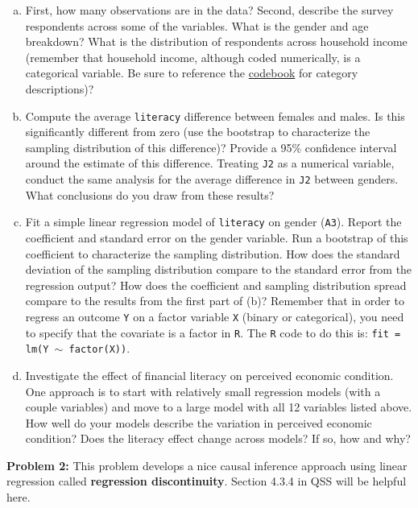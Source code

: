 \documentclass[11pt]{article}
\begin{document}
\begin{enumerate}[a.] 
\item First, how many observations are in the data? Second, describe the survey respondents across some of the variables.  What is the gender and age breakdown?  What is the distribution of respondents across household income (remember that household income, although coded numerically, is a categorical variable.  Be sure to reference the \href{https://github.com/dpuelz/Policy-Research-Laboratory/blob/main/readings/2018NFCScodebook.pdf}{codebook} for category descriptions)?  
\item Compute the average {\tt literacy} difference between females and males.  Is this significantly different from zero (use the bootstrap to characterize the sampling distribution of this difference)?  Provide a 95\% confidence interval around the estimate of this difference.  Treating {\tt J2} as a numerical variable, conduct the same analysis for the average difference in {\tt J2} between genders.  What conclusions do you draw from these results?
\item Fit a simple linear regression model of {\tt literacy} on gender ({\tt A3}).  Report the coefficient and standard error on the gender variable.  Run a bootstrap of this coefficient to characterize the sampling distribution.  How does the standard deviation of the sampling distribution compare to the standard error from the regression output?  How does the coefficient and sampling distribution spread compare to the results from the first part of (b)?  Remember that in order to regress an outcome {\tt Y} on a factor variable {\tt X} (binary or categorical), you need to specify that the covariate is a factor in {\tt R}.  The {\tt R} code to do this is: {\tt fit = lm(Y $\sim$ factor(X))}.
\item Investigate the effect of financial literacy on perceived economic condition.  One approach is to start with relatively small regression models (with a couple variables) and move to a large model with all 12 variables listed above.  How well do your models describe the variation in perceived economic condition?  Does the literacy effect change across models?  If so, how and why?
\end{enumerate}

\vspace{7mm}
\noindent \textbf{Problem 2:} This problem develops a nice causal inference approach using linear regression called \textbf{regression discontinuity}.  Section 4.3.4 in QSS will be helpful here.   
\end{document}
